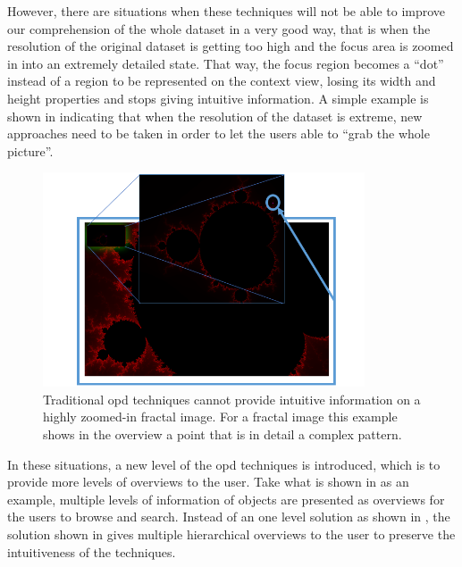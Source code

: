 However, there are situations when these techniques will not be able to improve our comprehension of the whole dataset in a very good way, that is when the resolution of the original dataset is getting too high and the focus area is zoomed in into an extremely detailed state. That way, the focus region becomes a ``dot'' instead of a region to be represented on the context view, losing its width and height properties and stops giving intuitive information. A simple example is shown in  indicating that when the resolution of the dataset is extreme, new approaches need to be taken in order to let the users able to ``grab the whole picture''.

\begin{figure}[H]
\centering
\includegraphics[width=0.85\textwidth,keepaspectratio]{Figures/Chapter1/becomespoint.png}
\decoRule
\caption[Focus Region Becomes a Dot on Context Region]{Traditional \gls{opd} techniques cannot provide intuitive information on a highly zoomed-in fractal image. For a fractal image this example shows in the overview a point that is in detail a complex pattern.}
\label{fig:becomespoint}
\end{figure}

In these situations, a new level of the \gls{opd} techniques is introduced, which is to provide more levels of overviews to the user. Take what is shown in  as an example, multiple levels of information of objects are presented as overviews for the users to browse and search. Instead of an one level solution as shown in , the solution shown in  gives multiple hierarchical overviews to the user to preserve the intuitiveness of the techniques.

